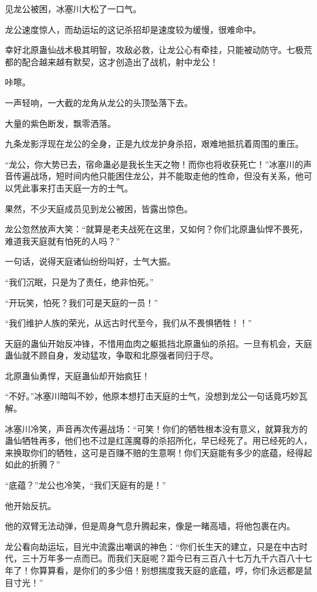 \begin{this_body}
见龙公被困，冰塞川大松了一口气。

龙公速度惊人，而劫运坛的这记杀招却是速度较为缓慢，很难命中。

幸好北原蛊仙战术极其明智，攻敌必救，让龙公心有牵挂，只能被动防守。七极荒都的配合越来越有默契，这才创造出了战机，射中龙公！

咔嚓。

一声轻响，一大截的龙角从龙公的头顶坠落下去。

大量的紫色断发，飘零洒落。

九条龙影浮现在龙公的全身，正是九纹龙护身杀招，艰难地抵抗着周围的重压。

“龙公，你大势已去，宿命蛊必是我长生天之物！而你也将收获死亡！”冰塞川的声音传遍战场，短时间内他只能困住龙公，并不能取走他的性命，但没有关系，他可以凭此事来打击天庭一方的士气。

果然，不少天庭成员见到龙公被困，皆露出惊色。

龙公忽然放声大笑：“就算是老夫战死在这里，又如何？你们北原蛊仙悍不畏死，难道我天庭就有怕死的人吗？”

一句话，说得天庭诸仙纷纷叫好，士气大振。

“我们沉眠，只是为了责任，绝非怕死。”

“开玩笑，怕死？我们可是天庭的一员！”

“我们维护人族的荣光，从远古时代至今，我们从不畏惧牺牲！！”

天庭的蛊仙开始反冲锋，不惜用血肉之躯抵挡北原蛊仙的杀招。一旦有机会，天庭蛊仙就不顾自身，发动猛攻，争取和北原强者同归于尽。

北原蛊仙勇悍，天庭蛊仙却开始疯狂！

“不好。”冰塞川暗叫不妙，他原本想打击天庭的士气，没想到龙公一句话竟巧妙瓦解。

冰塞川冷笑，声音再次传遍战场：“可笑！你们的牺牲根本没有意义，就算我方的蛊仙牺牲再多，他们也不过是红莲魔尊的杀招所化，早已经死了。用已经死的人，来换取你们的牺牲，这可是百赚不赔的生意啊！你们天庭能有多少的底蕴，经得起如此的折腾？”

“底蕴？”龙公也冷笑，“我们天庭有的是！”

他开始反抗。

他的双臂无法动弹，但是周身气息升腾起来，像是一睹高墙，将他包裹在内。

龙公看向劫运坛，目光中流露出嘲讽的神色：“你们长生天的建立，只是在中古时代，三十万年多一点而已。而我们天庭呢？距今已有三百八十七万九千六百八十七年了！你算算看，是你们的多少倍！别想揣度我天庭的底蕴，哼，你们永远都是鼠目寸光！”


\end{this_body}
